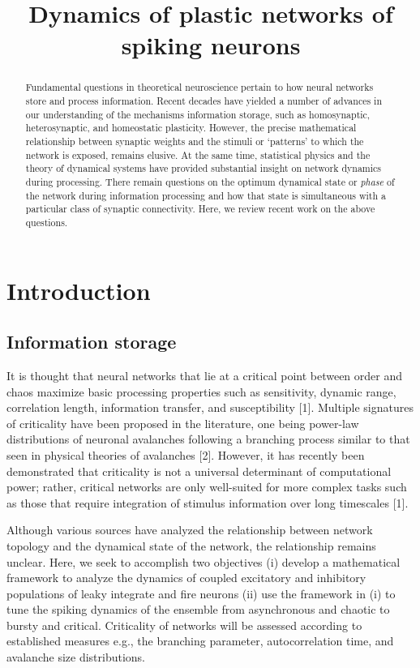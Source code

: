 \documentclass{article} %
\title{Dynamics of plastic networks of spiking neurons}
\begin{document}
\maketitle

\begin{abstract}

Fundamental questions in theoretical neuroscience pertain to how neural networks store and process information. Recent decades have yielded a number of advances in our understanding of the mechanisms information storage, such as homosynaptic, heterosynaptic, and homeostatic plasticity. However, the precise mathematical relationship between synaptic weights and the stimuli or `patterns' to which the network is exposed, remains elusive. At the same time, statistical physics and the theory of dynamical systems have provided substantial insight on network dynamics during processing. There remain questions on the optimum dynamical state or \emph{phase} of the network during information processing and how that state is simultaneous with a particular class of synaptic connectivity. Here, we review recent work on the above questions.


\end{abstract}


\section{Introduction}

\subsection{Information storage}

It is thought that neural networks that lie at a critical point between order and chaos maximize basic processing properties such as sensitivity, dynamic range, correlation length, information transfer, and susceptibility [1]. Multiple signatures of criticality have been proposed in the literature, one being power-law distributions of neuronal avalanches following a branching process similar to that seen in physical theories of avalanches [2]. However, it has recently been demonstrated that criticality is not a universal determinant of computational power; rather, critical networks are only well-suited for more complex tasks such as those that require integration of stimulus information over long timescales [1]. 

Although various sources have analyzed the relationship between network topology and the dynamical state of the network, the relationship remains unclear. Here, we seek to accomplish two objectives (i) develop a mathematical framework to analyze the dynamics of coupled excitatory and inhibitory populations of leaky integrate and fire neurons (ii) use the framework in (i) to tune the spiking dynamics of the ensemble from asynchronous and chaotic to bursty and critical. Criticality of networks will be assessed according to established measures e.g., the branching parameter, autocorrelation time, and avalanche size distributions. 
\end{document}
